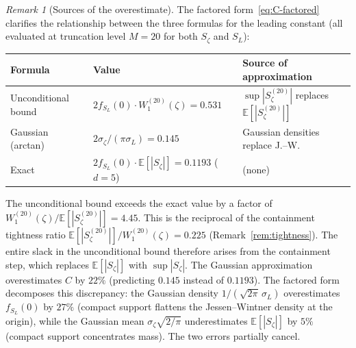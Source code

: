 \documentclass[12pt,reqno]{amsart}
\theoremstyle{plain}
\theoremstyle{definition}
\theoremstyle{remark}
\newtheorem{remark}[theorem]{Remark}
\newcommand{\E}{\mathbb{E}}
\begin{document}
\begin{remark}[Sources of the overestimate]\label{rem:overestimate-sources}
The factored form~\eqref{eq:C-factored} clarifies the relationship between the three formulas for the leading constant (all evaluated at truncation level $M = 20$ for both $S_\zeta$ and $S_L$):
\begin{center}
\renewcommand{\arraystretch}{1.2}
\begin{tabular}{lll}
\toprule
Formula & Value & Source of approximation \\
\midrule
Unconditional bound & $2f_{S_L}(0)\cdot W_1^{(20)}(\zeta) = 0.531$ & $\sup|S_\zeta^{(20)}|$ replaces $\E[|S_\zeta^{(20)}|]$ \\
Gaussian (arctan) & $2\sigma_\zeta/(\pi\sigma_L) = 0.145$ & Gaussian densities replace J.--W. \\
Exact & $2f_{S_L}(0)\cdot \E[|S_\zeta|] = 0.1193$ ($d = 5$) & (none) \\
\bottomrule
\end{tabular}
\end{center}
The unconditional bound exceeds the exact value by a factor of $W_1^{(20)}(\zeta)/\E[|S_\zeta^{(20)}|] = 4.45$.  This is the reciprocal of the containment tightness ratio $\E[|S_\zeta^{(20)}|]/W_1^{(20)}(\zeta) = 0.225$ (Remark~\ref{rem:tightness}).  The entire slack in the unconditional bound therefore arises from the containment step, which replaces $\E[|S_\zeta|]$ with $\sup|S_\zeta|$.  The Gaussian approximation overestimates $C$ by $22\%$ (predicting $0.145$ instead of $0.1193$).  The factored form decomposes this discrepancy: the Gaussian density $1/(\sqrt{2\pi}\,\sigma_L)$ overestimates $f_{S_L}(0)$ by $27\%$ (compact support flattens the Jessen--Wintner density at the origin), while the Gaussian mean $\sigma_\zeta\sqrt{2/\pi}$ underestimates $\E[|S_\zeta|]$ by $5\%$ (compact support concentrates mass).  The two errors partially cancel.
\end{remark}
\end{document}
